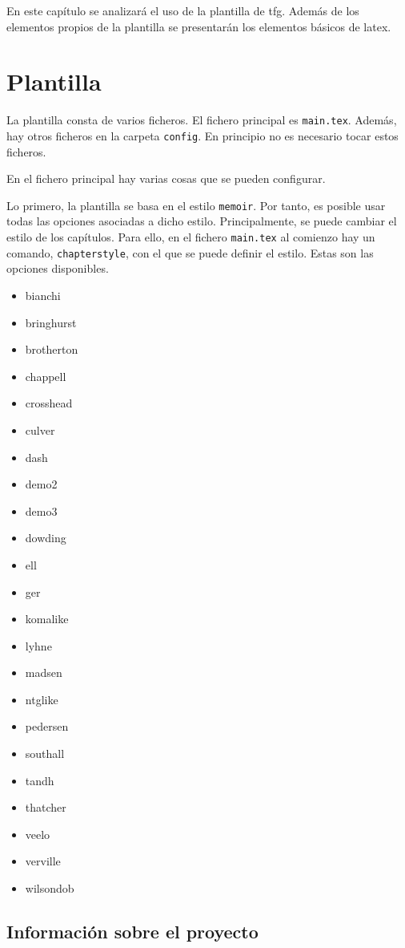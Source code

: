 En este capítulo se analizará el uso de la plantilla de \acrfull{tfg}. Además de los elementos propios de la plantilla se presentarán los elementos básicos de \gls{latex}.

\section{Plantilla}\label{sec:plantilla}


La plantilla consta de varios ficheros. El fichero principal es \texttt{main.tex}. Además, hay otros ficheros en la carpeta \texttt{config}. En principio no es necesario tocar estos ficheros.


En el fichero principal hay varias cosas que se pueden configurar.

Lo primero, la plantilla se basa en el estilo \texttt{memoir}. Por tanto, es posible usar todas las opciones asociadas a dicho estilo. Principalmente, se puede cambiar el estilo de los capítulos. Para ello, en el fichero \texttt{main.tex} al comienzo hay un comando, \texttt{chapterstyle}, con el que se puede definir el estilo. Estas son las opciones disponibles.
\begin{itemize}
	\item bianchi
	\item bringhurst
	\item brotherton
	\item chappell
	\item crosshead
	\item culver
	\item dash
	\item demo2
	\item demo3
	\item dowding
	\item ell
	\item ger
	\item komalike
	\item lyhne
	\item madsen
	\item ntglike
	\item pedersen
	\item southall
	\item tandh
	\item thatcher
	\item veelo
	\item verville
	\item wilsondob
\end{itemize}

\subsection{Información sobre el proyecto}

